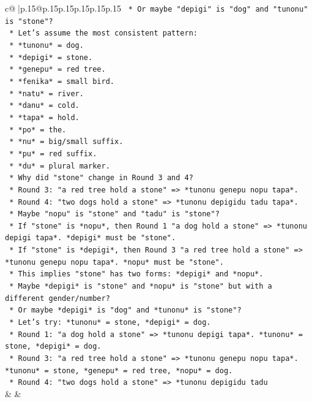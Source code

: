 \documentclass{article}
\begin{document}
{\begin{supertabular}{c@{$\;$}|p{.15\linewidth}@{}p{.15\linewidth}p{.15\linewidth}p{.15\linewidth}p{.15\linewidth}p{.15\linewidth}}
{{{\texttt{        *   Or maybe "depigi" is "dog" and "tunonu" is "stone"?} \\
\texttt{        *   Let's assume the most consistent pattern:} \\
\texttt{        *   *tunonu* = dog.} \\
\texttt{        *   *depigi* = stone.} \\
\texttt{        *   *genepu* = red tree.} \\
\texttt{        *   *fenika* = small bird.} \\
\texttt{        *   *natu* = river.} \\
\texttt{        *   *danu* = cold.} \\
\texttt{        *   *tapa* = hold.} \\
\texttt{        *   *po* = the.} \\
\texttt{        *   *nu* = big/small suffix.} \\
\texttt{        *   *pu* = red suffix.} \\
\texttt{        *   *du* = plural marker.} \\
\texttt{        *   Why did "stone" change in Round 3 and 4?} \\
\texttt{        *   Round 3: "a red tree hold a stone" => *tunonu genepu nopu tapa*.} \\
\texttt{        *   Round 4: "two dogs hold a stone" => *tunonu depigidu tadu tapa*.} \\
\texttt{        *   Maybe "nopu" is "stone" and "tadu" is "stone"?} \\
\texttt{        *   If "stone" is *nopu*, then Round 1 "a dog hold a stone" => *tunonu depigi tapa*. *depigi* must be "stone".} \\
\texttt{        *   If "stone" is *depigi*, then Round 3 "a red tree hold a stone" => *tunonu genepu nopu tapa*. *nopu* must be "stone".} \\
\texttt{        *   This implies "stone" has two forms: *depigi* and *nopu*.} \\
\texttt{        *   Maybe *depigi* is "stone" and *nopu* is "stone" but with a different gender/number?} \\
\texttt{        *   Or maybe *depigi* is "dog" and *tunonu* is "stone"?} \\
\texttt{        *   Let's try: *tunonu* = stone, *depigi* = dog.} \\
\texttt{        *   Round 1: "a dog hold a stone" => *tunonu depigi tapa*. *tunonu* = stone, *depigi* = dog.} \\
\texttt{        *   Round 3: "a red tree hold a stone" => *tunonu genepu nopu tapa*. *tunonu* = stone, *genepu* = red tree, *nopu* = dog.} \\
\texttt{        *   Round 4: "two dogs hold a stone" => *tunonu depigidu tadu} \\
            }
        }
    }
    & & \\ \\


\end{supertabular}}
\end{document}
